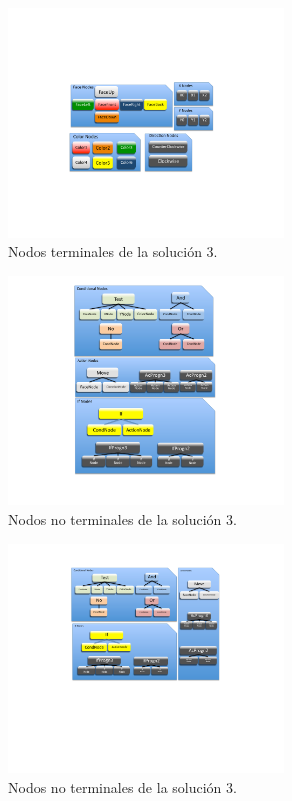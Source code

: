 \begin{figure}[ctb]
\centering
\includegraphics[width=0.65\textwidth]{figs/pdf/leng3nodosterm}
\caption{Nodos terminales de la solución 3.}
\label{fig:leng3nodosterm}
\end{figure}

\begin{figure}[ctb]
\centering
\includegraphics[width=0.65\textwidth]{figs/pdf/leng3nodosnoterma}
\caption{Nodos no terminales de la solución 3.}
\label{fig:leng3nodosnoterma}
\end{figure}

\begin{figure}[ctb]
\centering
\includegraphics[width=0.65\textwidth]{figs/pdf/leng3nodosnotermb}
\caption{Nodos no terminales de la solución 3.}
\label{fig:leng3nodosnotermb}
\end{figure}

